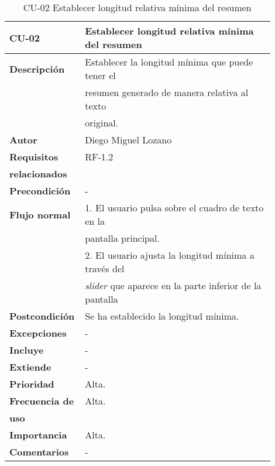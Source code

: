 \begin{longtable}{>{\raggedright}b{0.2\linewidth}>{\raggedright\arraybackslash}b{0.7\linewidth}}
	\toprule
	\textbf{CU-02} & \textbf{Establecer longitud relativa mínima del resumen} \\
	\toprule
	\endhead
	
	\toprule
	\caption{CU-02 Establecer longitud relativa mínima del resumen}
	\endfoot
	
	\small{\textbf{Descripción}} & Establecer la longitud mínima que puede tener el \\
	& resumen generado de manera relativa al texto \\ & original. \\
	\small{\textbf{Autor}} & Diego Miguel Lozano \\
	\small{\textbf{Requisitos}} & RF-1.2  \\
	\small{\textbf{relacionados}} & \\
	\small{\textbf{Precondición}} & - \\
	\small{\textbf{Flujo normal}} & \quad \small{1. El usuario pulsa sobre el cuadro de texto en la} \\
	& \qquad \small{pantalla principal.} \\
	& \quad \small{2. El usuario ajusta la longitud mínima a través del} \\
	& \qquad \small{\emph{slider} que aparece en la parte inferior de la pantalla} \\
	\small{\textbf{Postcondición}} & Se ha establecido la longitud mínima. \\
	\small{\textbf{Excepciones}} & - \\
	\small{\textbf{Incluye}} & - \\
	\small{\textbf{Extiende}} & - \\
	\small{\textbf{Prioridad}} & Alta. \\
	\small{\textbf{Frecuencia de}} & Alta. \\
	\small{\textbf{uso}} & \\
	\small{\textbf{Importancia}} & Alta. \\
	\small{\textbf{Comentarios}} &  - \\
\end{longtable}

